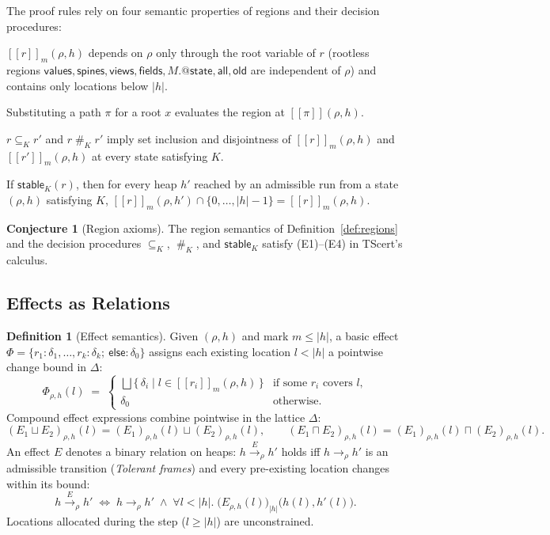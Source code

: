 \documentclass[10pt,a4paper]{article}
\makeatletter
\theoremstyle{definition}
\newtheorem{definition}{Definition}
\newtheorem{conjecture}{Conjecture}
\newcommand{\kw}[1]{\mathsf{#1}}
\newcommand{\val}{\kw{values}}
\newcommand{\st}{\kw{spines}}
\newcommand{\vw}{\kw{views}}
\newcommand{\sem}[1]{[\![#1]\!]}
\newcommand{\tr}[1]{\xrightarrow{#1}}
\newcommand{\sep}{\mathrel{\#}}
\newcommand{\len}[1]{|#1|}
\newcommand{\modstate}[1]{#1.{@\kw{state}}}
\makeatother
\begin{document}
The proof rules rely on four semantic properties of regions and their
decision procedures:
\begin{description}[leftmargin=1.5em,itemsep=1pt]
\item[(E1) Locality and bounds:] $\sem{r}_m(\rho,h)$ depends on $\rho$
  only through the root variable of $r$ (rootless regions
  $\val,\st,\vw,\kw{fields},\modstate{M},\kw{all},\kw{old}$ are
  independent of $\rho$) and contains only locations below $\len h$.
\item[(E2) Substitution:] Substituting a path $\pi$ for a root $x$
  evaluates the region at $\sem{\pi}(\rho,h)$.
\item[(E3) Sound decisions:] $r\subseteq_K r'$ and $r\sep_K r'$ imply
  set inclusion and disjointness of $\sem{r}_m(\rho,h)$ and
  $\sem{r'}_m(\rho,h)$ at every state satisfying $K$.
\item[(E4) Stability:] If $\kw{stable}_K(r)$, then for every heap $h'$
  reached by an admissible run from a state $(\rho,h)$ satisfying $K$,
  $\sem{r}_m(\rho,h')\cap\{0,\dots,\len h-1\}=\sem{r}_m(\rho,h)$.
\end{description}

\begin{conjecture}[Region axioms]\label{conj:regions}
The region semantics of Definition~\ref{def:regions} and the decision
procedures $\subseteq_K$, $\sep_K$, and $\kw{stable}_K$ satisfy
(E1)--(E4) in TScert's calculus.
\end{conjecture}

\subsection{Effects as Relations}

\begin{definition}[Effect semantics]\label{def:effect}
Given $(\rho,h)$ and mark $m\le\len h$, a basic effect
$\Phi=\{r_1:\delta_1,\ldots,r_k:\delta_k;\ \kw{else}:\delta_0\}$ assigns
each existing location $l<\len h$ a pointwise change bound in $\Delta$:
\[
\Phi_{\rho,h}(l)\;=\;
\begin{cases}
  \bigsqcup\{\,\delta_i \mid l\in\sem{r_i}_m(\rho,h)\,\} & \text{if some }r_i\text{ covers }l,\\
  \delta_0 & \text{otherwise.}
\end{cases}
\]
Compound effect expressions combine pointwise in the lattice $\Delta$:
\[
(E_1\sqcup E_2)_{\rho,h}(l) = (E_1)_{\rho,h}(l)\sqcup(E_2)_{\rho,h}(l),
\qquad
(E_1\sqcap E_2)_{\rho,h}(l) = (E_1)_{\rho,h}(l)\sqcap(E_2)_{\rho,h}(l).
\]
An effect $E$ denotes a binary relation on heaps: $h\tr{E}_\rho h'$ holds
iff $h\tr{}_\rho h'$ is an admissible transition (\emph{Tolerant
frames}) and every pre-existing location changes within its bound:
\[
h\tr{E}_\rho h' \;\iff\; h\tr{}_\rho h' \;\wedge\;
  \forall l<\len h.\;\bigl(E_{\rho,h}(l)\bigr)_{\len h}\bigl(h(l),h'(l)\bigr).
\]
Locations allocated during the step ($l\ge\len h$) are unconstrained.
\end{definition}
\end{document}
